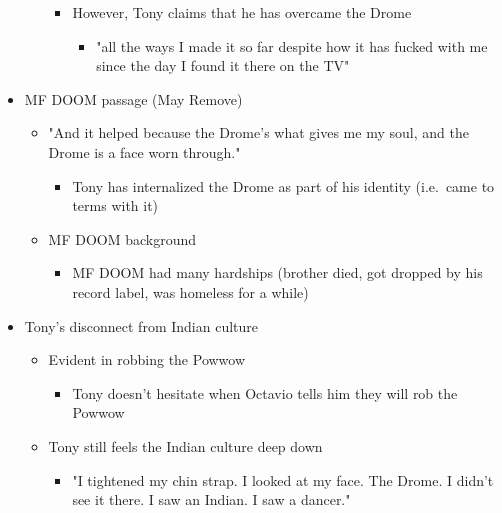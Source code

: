 \documentclass[letterpaper]{article}
\begin{document}
\begin{itemize}
\begin{itemize}
\begin{itemize}
\item However, Tony claims that he has overcame the Drome

\begin{itemize}
\item "all the ways I made it so far despite how it has fucked with me
since the day I found it there on the TV"
\end{itemize}
\end{itemize}
\end{itemize}

\item MF DOOM passage (May Remove)

\begin{itemize}
\item "And it helped because the Drome's what gives me my soul, and the
Drome is a face worn through."

\begin{itemize}
\item Tony has internalized the Drome as part of his identity (i.e. came
to terms with it)
\end{itemize}

\item MF DOOM background

\begin{itemize}
\item MF DOOM had many hardships (brother died, got dropped by his
record label, was homeless for a while)
\end{itemize}
\end{itemize}

\item Tony's disconnect from Indian culture

\begin{itemize}
\item Evident in robbing the Powwow

\begin{itemize}
\item Tony doesn't hesitate when Octavio tells him they will rob the
Powwow
\end{itemize}

\item Tony still feels the Indian culture deep down

\begin{itemize}
\item "I tightened my chin strap. I looked at my face. The Drome. I
didn't see it there. I saw an Indian. I saw a dancer."


\end{itemize}
\end{itemize}
\end{itemize}
\end{document}
